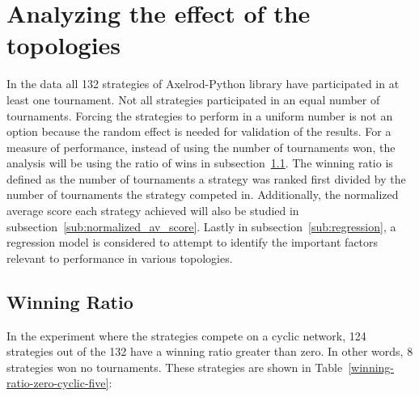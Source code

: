 \section{Analyzing the effect of the topologies}
\label{sub:analyzing_the_effect_of_the_topologies}
In the data all 132 strategies of Axelrod-Python library have participated in at
least one tournament. Not all strategies participated in an equal number of tournaments.
Forcing the strategies to perform in a uniform number is
not an option because the random effect is needed for validation of the
results. For a measure of
performance, instead of using the number of tournaments won, the analysis will
be using the ratio of wins in subsection~\ref{sub:winning-ratio}.
The winning ratio is defined as the number of tournaments a strategy was ranked
first divided by the number of tournaments the strategy competed in.
Additionally, the normalized average score each strategy
achieved will also be studied in subsection~\ref{sub:normalized_av_score}.
Lastly in subsection~\ref{sub:regression}, a regression model is considered to
attempt to identify the important factors relevant to performance in various
topologies.

\subsection{Winning Ratio}
\label{sub:winning-ratio}
In the experiment where the strategies compete on a cyclic network, 124 strategies
out of the 132 have a winning ratio greater than zero. In other words, 8 strategies
won no tournaments. These strategies are shown in Table~\ref{winning-ratio-zero-cyclic-five}:

